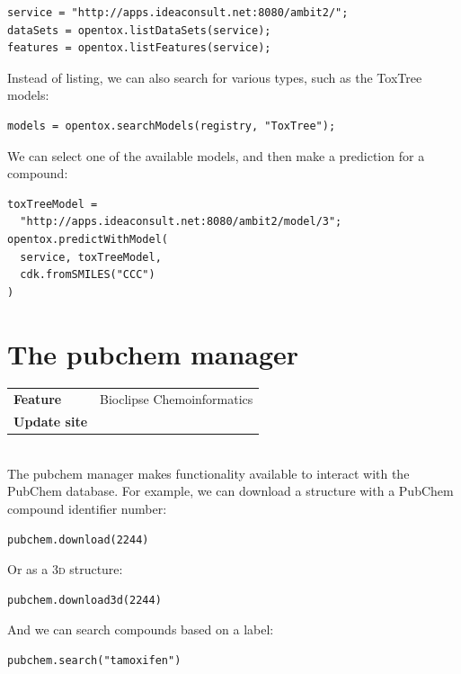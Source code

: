 \documentclass[a5paper, 10pt]{memoir}
\begin{document}
\begin{refsection}
\begin{Verbatim}
service = "http://apps.ideaconsult.net:8080/ambit2/";
dataSets = opentox.listDataSets(service);
features = opentox.listFeatures(service);
\end{Verbatim}
Instead of listing, we can also search for various types, such as the ToxTree
models\cite{patlewicz2008evaluation}:

\begin{Verbatim}
models = opentox.searchModels(registry, "ToxTree");
\end{Verbatim}
We can select one of the available models, and then make a prediction for a
compound:
\begin{Verbatim}
toxTreeModel =
  "http://apps.ideaconsult.net:8080/ambit2/model/3";
opentox.predictWithModel(
  service, toxTreeModel,
  cdk.fromSMILES("CCC")
)
\end{Verbatim}

\section{The pubchem manager}

\begin{tabular}{ll}
\textbf{Feature} & Bioclipse Chemoinformatics \\
\textbf{Update site} & \url{} \\
\end{tabular} \\

\noindent
The pubchem manager makes functionality available to interact with the PubChem
database. For example, we can download a structure with a
PubChem compound identifier number:

\begin{Verbatim}
pubchem.download(2244)
\end{Verbatim}
Or as a 3\textsc{d} structure:

\begin{Verbatim}
pubchem.download3d(2244)
\end{Verbatim}
And we can search compounds based on a label:

\begin{Verbatim}
pubchem.search("tamoxifen")
\end{Verbatim}

\printbibliography[heading=subbibliography]
\end{refsection}


\cleardoublepage
\printindex
\end{document}
